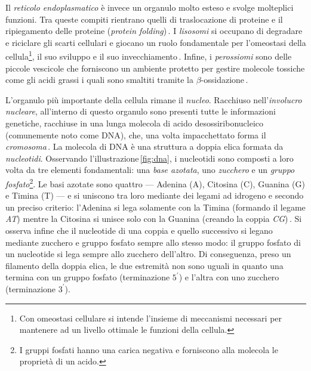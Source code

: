 Il \textsl{reticolo endoplasmatico} è invece un organulo molto esteso e svolge molteplici funzioni. Tra queste compiti rientrano quelli di traslocazione di proteine e il ripiegamento delle proteine (\textsl{protein folding})\,\cite{alberts2015essential, voeltz2002structural}. I \textsl{lisosomi} si occupano di degradare e riciclare gli scarti cellulari e giocano un ruolo fondamentale per l'omeostasi della cellula\footnote{Con omeostasi cellulare si intende l'insieme di meccanismi necessari per mantenere ad un livello ottimale le funzioni della cellula.}, il suo sviluppo e il suo invecchiamento\,\cite{ballabio2016awesome, yang2021lysosome, dell2000lysosome}. Infine, i \textsl{perossiomi} sono delle piccole vescicole che forniscono un ambiente protetto per gestire molecole tossiche come gli acidi grassi i quali sono smaltiti tramite la $\beta$-ossidazione\,\cite{alberts2015essential, islinger2012peroxisome, islinger2018peroxisome}.

L'organulo più importante della cellula rimane il \textsl{nucleo}. Racchiuso nell'\textsl{involucro nucleare}, all'interno di questo organulo sono presenti tutte le informazioni genetiche, racchiuse in una lunga molecola di acido desossiribonucleico (comunemente noto come DNA), che, una volta impacchettato forma il \textsl{cromosoma}\,\cite{pollard2022cell, alberts2015essential}. La molecola di DNA è una struttura a doppia elica formata da \textsl{nucleotidi}. Osservando l'illustrazione\,\ref{fig:dna}, i nucleotidi sono composti a loro volta da tre elementi fondamentali: una \textsl{base azotata}, uno \textsl{zucchero} e un \textsl{gruppo fosfato}\footnote{I gruppi fosfati hanno una carica negativa e forniscono alla molecola le proprietà di un acido.}. Le basi azotate sono quattro — Adenina (A), Citosina (C), Guanina (G) e Timina (T) — e si uniscono tra loro mediante dei legami ad idrogeno e secondo un preciso criterio: l'Adenina si lega solamente con la Timina (formando il legame \textit{AT}) mentre la Citosina si unisce solo con la Guanina (creando la coppia \textit{CG})\,\cite{fonseca2000hydrogen, sahu2011identification}. Si osserva infine che il nucleotide di una coppia e quello successivo si legano mediante zucchero e gruppo fosfato sempre allo stesso modo: il gruppo fosfato di un nucleotide si lega sempre allo zucchero dell'altro. Di conseguenza, preso un filamento della doppia elica, le due estremità non sono uguali in quanto una termina con un gruppo fosfato (terminazione $5^\prime$) e l'altra con uno zucchero (terminazione $3^\prime$).

